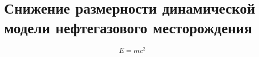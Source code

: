 \chapter{Снижение размерности динамической модели нефтегазового месторождения}\label{ch:ch2}


\begin{equation}
    E = m c^2
\end{equation}

